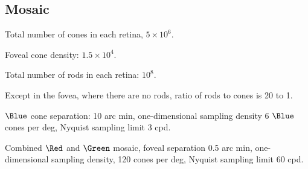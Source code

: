 \subsection*{Mosaic}

\be

\item Total number of cones in each retina, $5 \times 10^6$.
 



\item Foveal cone density:  $1.5 \times 10^4$.

\item Total number of rods in each retina: $10^8$.

\item Except in the fovea, where there are no rods,
ratio of rods to cones is 20 to 1.

\item $\Blue$ cone separation: 10 arc min, one-dimensional sampling
density 6 $\Blue$ cones per deg, Nyquist sampling limit 3 cpd.

\item Combined $\Red$ and $\Green$ mosaic, foveal separation 0.5 arc
min, one-dimensional sampling density, 120 cones per deg, Nyquist
sampling limit 60 cpd.

